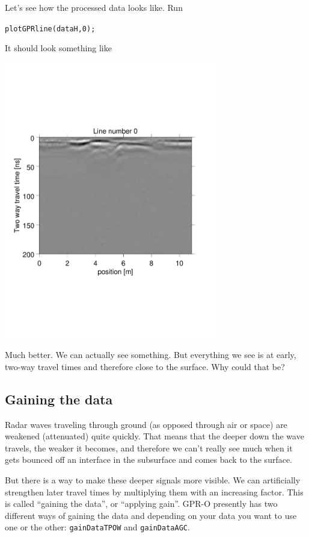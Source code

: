 \documentclass[11pt]{article}
\begin{document}
Let's see how the processed data looks like. Run

\qquad \verb#plotGPRline(dataH,0);#

\clearpage
It should look something like

\begin{center}
\includegraphics[width=0.7\textwidth, trim = 0.9cm 6cm 2cm
  6.5cm,clip]{figures/GPRlineH0}
\end{center}
 
Much better. We can actually see something. But everything we see is
at early, two-way travel times and therefore close to the surface. Why
could that be?

\subsection{Gaining the data}

Radar waves traveling through ground (as opposed
through air or space) are weakened (attenuated) quite
quickly. That means that the deeper down the wave travels, the weaker it
becomes, and therefore we can't really see much when it gets bounced off an
interface in the subsurface and comes back to the surface.
 
But there is a way to make these deeper signals more visible. We can
artificially strengthen later travel times by multiplying them with an
increasing factor. This is called ``gaining the data'', or ``applying
gain''. GPR-O presently has two different ways of gaining the data and
depending on your data you want to use one or the other:
\verb#gainDataTPOW# and \verb#gainDataAGC#.
\end{document}
